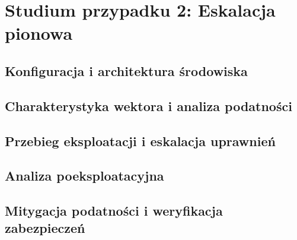 \chapter{Studium przypadku 2: Eskalacja pionowa}\label{ch:cs2-pionowa}

\section{Konfiguracja i architektura środowiska}\label{sec:cs2-srodowisko}

\section{Charakterystyka wektora i analiza podatności}\label{sec:cs2-teoria-podatnosc}

\section{Przebieg eksploatacji i eskalacja uprawnień}\label{sec:cs2-eksploatacja}

\section{Analiza poeksploatacyjna}\label{sec:cs2-analiza-poeksploatacyjna}

\section{Mitygacja podatności i weryfikacja zabezpieczeń}\label{sec:cs2-mitygacja}

